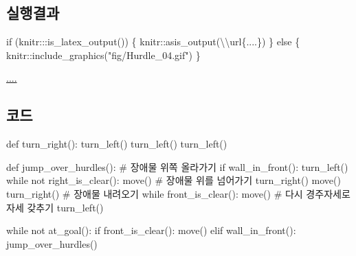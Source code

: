 \documentclass[
  b5paperpaper,
  DIV=11,
  numbers=noendperiod]{scrreprt}
\newenvironment{Shaded}{\begin{snugshade}}{\end{snugshade}}
\newcommand{\CommentTok}[1]{\textcolor[rgb]{0.37,0.37,0.37}{#1}}
\newcommand{\ControlFlowTok}[1]{\textcolor[rgb]{0.00,0.23,0.31}{#1}}
\newcommand{\FunctionTok}[1]{\textcolor[rgb]{0.28,0.35,0.67}{#1}}
\newcommand{\NormalTok}[1]{\textcolor[rgb]{0.00,0.23,0.31}{#1}}
\newcommand{\SpecialCharTok}[1]{\textcolor[rgb]{0.37,0.37,0.37}{#1}}
\newcommand{\StringTok}[1]{\textcolor[rgb]{0.13,0.47,0.30}{#1}}
\begin{document}
\hypertarget{uxc2e4uxd589uxacb0uxacfc-14}{%
\subsection{실행결과}\label{uxc2e4uxd589uxacb0uxacfc-14}}

\begin{Shaded}
\begin{Highlighting}[]
\ControlFlowTok{if}\NormalTok{ (knitr}\SpecialCharTok{:::}\FunctionTok{is\_latex\_output}\NormalTok{()) \{}
\NormalTok{  knitr}\SpecialCharTok{::}\FunctionTok{asis\_output}\NormalTok{(}\StringTok{\textquotesingle{}}\SpecialCharTok{\textbackslash{}\textbackslash{}}\StringTok{url\{....\}\textquotesingle{}}\NormalTok{)}
\NormalTok{\} }\ControlFlowTok{else}\NormalTok{ \{}
\NormalTok{  knitr}\SpecialCharTok{::}\FunctionTok{include\_graphics}\NormalTok{(}\StringTok{"fig/Hurdle\_04.gif"}\NormalTok{)}
\NormalTok{\}}
\end{Highlighting}
\end{Shaded}

\url{....}

\hypertarget{uxcf54uxb4dc-14}{%
\subsection{코드}\label{uxcf54uxb4dc-14}}

\begin{Shaded}
\begin{Highlighting}[]
\NormalTok{def }\FunctionTok{turn\_right}\NormalTok{()}\SpecialCharTok{:}
    \FunctionTok{turn\_left}\NormalTok{()}
    \FunctionTok{turn\_left}\NormalTok{()}
    \FunctionTok{turn\_left}\NormalTok{()}

\NormalTok{def }\FunctionTok{jump\_over\_hurdles}\NormalTok{()}\SpecialCharTok{:}
    \CommentTok{\# 장애물 위쪽 올라가기}
    \ControlFlowTok{if} \FunctionTok{wall\_in\_front}\NormalTok{()}\SpecialCharTok{:}
        \FunctionTok{turn\_left}\NormalTok{()}
        \ControlFlowTok{while}\NormalTok{ not }\FunctionTok{right\_is\_clear}\NormalTok{()}\SpecialCharTok{:}
            \FunctionTok{move}\NormalTok{()}
    \CommentTok{\# 장애물 위를 넘어가기            }
    \FunctionTok{turn\_right}\NormalTok{()}
    \FunctionTok{move}\NormalTok{()}
    \FunctionTok{turn\_right}\NormalTok{()}
    \CommentTok{\# 장애물 내려오기}
    \ControlFlowTok{while} \FunctionTok{front\_is\_clear}\NormalTok{()}\SpecialCharTok{:}
        \FunctionTok{move}\NormalTok{()}
    \CommentTok{\# 다시 경주자세로 자세 갖추기}
    \FunctionTok{turn\_left}\NormalTok{()}

\ControlFlowTok{while}\NormalTok{ not }\FunctionTok{at\_goal}\NormalTok{()}\SpecialCharTok{:}
    \ControlFlowTok{if} \FunctionTok{front\_is\_clear}\NormalTok{()}\SpecialCharTok{:}
        \FunctionTok{move}\NormalTok{()}
\NormalTok{    elif }\FunctionTok{wall\_in\_front}\NormalTok{()}\SpecialCharTok{:}
        \FunctionTok{jump\_over\_hurdles}\NormalTok{()}
\end{Highlighting}
\end{Shaded}
\end{document}
